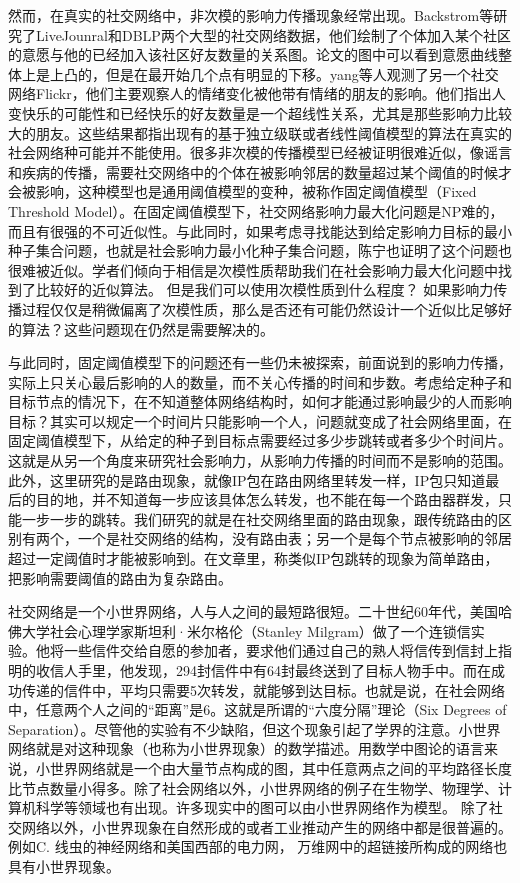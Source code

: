 然而，在真实的社交网络中，非次模的影响力传播现象经常出现。Backstrom等\cite{backstrom2006group}研究了LiveJounral和DBLP两个大型的社交网络数据，他们绘制了个体加入某个社区的意愿与他的已经加入该社区好友数量的关系图。论文的图中可以看到意愿曲线整体上是上凸的，但是在最开始几个点有明显的下移。yang等人\cite{yang2016role}观测了另一个社交网络Flickr，他们主要观察人的情绪变化被他带有情绪的朋友的影响。他们指出人变快乐的可能性和已经快乐的好友数量是一个超线性关系，尤其是那些影响力比较大的朋友。这些结果都指出现有的基于独立级联或者线性阈值模型的算法在真实的社会网络种可能并不能使用。很多非次模的传播模型已经被证明很难近似，像谣言和疾病的传播，需要社交网络中的个体在被影响邻居的数量超过某个阈值的时候才会被影响，这种模型也是通用阈值模型的变种，被称作固定阈值模型（Fixed Threshold Model）。在固定阈值模型下，社交网络影响力最大化问题是NP难的，而且有很强的不可近似性\cite{Kempe2003maximizing}。与此同时，如果考虑寻找能达到给定影响力目标的最小种子集合问题，也就是社会影响力最小化种子集合问题，陈宁也证明了这个问题也很难被近似\cite{Chen2008approximability}。学者们倾向于相信是次模性质帮助我们在社会影响力最大化问题中找到了比较好的近似算法。
但是我们可以使用次模性质到什么程度？
如果影响力传播过程仅仅是稍微偏离了次模性质，那么是否还有可能仍然设计一个近似比足够好的算法？这些问题现在仍然是需要解决的。

与此同时，固定阈值模型下的问题还有一些仍未被探索，前面说到的影响力传播，实际上只关心最后影响的人的数量，而不关心传播的时间和步数。考虑给定种子和目标节点的情况下，在不知道整体网络结构时，如何才能通过影响最少的人而影响目标？其实可以规定一个时间片只能影响一个人，问题就变成了社会网络里面，在固定阈值模型下，从给定的种子到目标点需要经过多少步跳转或者多少个时间片。这就是从另一个角度来研究社会影响力，从影响力传播的时间而不是影响的范围。此外，这里研究的是路由现象，就像IP包在路由网络里转发一样，IP包只知道最后的目的地，并不知道每一步应该具体怎么转发，也不能在每一个路由器群发，只能一步一步的跳转。我们研究的就是在社交网络里面的路由现象，跟传统路由的区别有两个，一个是社交网络的结构，没有路由表；另一个是每个节点被影响的邻居超过一定阈值时才能被影响到。在文章里，称类似IP包跳转的现象为简单路由，把影响需要阈值的路由为复杂路由。

社交网络是一个小世界网络，人与人之间的最短路很短。二十世纪60年代，美国哈佛大学社会心理学家斯坦利·米尔格伦（Stanley Milgram）做了一个连锁信实验\cite{Milgram1967small}。他将一些信件交给自愿的参加者，要求他们通过自己的熟人将信传到信封上指明的收信人手里，他发现，294封信件中有64封最终送到了目标人物手中。而在成功传递的信件中，平均只需要5次转发，就能够到达目标。也就是说，在社会网络中，任意两个人之间的“距离”是6。这就是所谓的“六度分隔”理论（Six Degrees of Separation）。尽管他的实验有不少缺陷，但这个现象引起了学界的注意。小世界网络就是对这种现象（也称为小世界现象）的数学描述。用数学中图论的语言来说，小世界网络就是一个由大量节点构成的图，其中任意两点之间的平均路径长度比节点数量小得多。除了社会网络以外，小世界网络的例子在生物学、物理学、计算机科学等领域也有出现。许多现实中的图可以由小世界网络作为模型。
除了社交网络以外，小世界现象在自然形成的或者工业推动产生的网络中都是很普遍的。
例如C. 线虫的神经网络和美国西部的电力网\cite{Watts1998collective}，
万维网中的超链接所构成的网络也具有小世界现象\cite{Albert1999internet}。

